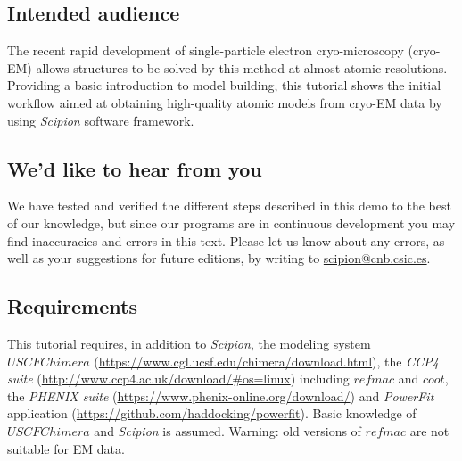 \documentclass[12pt, draft]{article} %
\def\scipion{\textit{Scipion}\xspace}
\begin{document}


\subsection*{Intended audience}
The recent rapid development of single-particle electron cryo-microscopy (cryo-EM) allows structures to be solved by this method at almost atomic resolutions.  Providing a basic introduction to model building, this tutorial shows the initial workflow aimed at obtaining high-quality atomic models from cryo-EM data by using \scipion software framework. %


\subsection*{We'd like to hear from you}

We have tested and verified the different steps described in this demo
to the best of our knowledge, but since our programs are in continuous
development you may find inaccuracies and errors in this text. Please
let us know about any errors, as well as your suggestions for
future editions, by writing to
\href{mailto:scipion@cnb.csic.es}{scipion@cnb.csic.es}.


\subsection*{Requirements}

This tutorial requires, in addition to \scipion,  the modeling system $USCF Chimera$ (\url{https://www.cgl.ucsf.edu/chimera/download.html}), the \textit{CCP4 suite} (\url{http://www.ccp4.ac.uk/download/#os=linux}) including $refmac$ and $coot$, the \textit{PHENIX suite} (\url{https://www.phenix-online.org/download/}) and \textit{PowerFit} application (\url{https://github.com/haddocking/powerfit}). Basic knowledge of $USCF Chimera$ and \scipion is assumed. Warning: old versions of $refmac$ are not suitable for EM data.

\newpage


\end{document}
